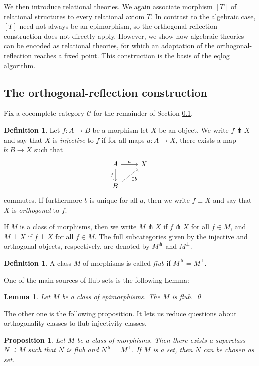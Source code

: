 \documentclass[a4paper]{article}
\newtheorem{lemma}[theorem]{Lemma}
\newtheorem{proposition}[theorem]{Proposition}
\theoremstyle{remark}
\theoremstyle{definition}
\newtheorem{definition}[theorem]{Definition}
\begin{document}
We then introduce relational theories.
We again associate morphism $[T]$ of relational structures to every relational axiom $T$.
In contrast to the algebraic case, $[T]$ need not always be an epimorphism, so the orthogonal-reflection construction does not directly apply.
However, we show how algebraic theories can be encoded as relational theories, for which an adaptation of the orthogonal-reflection reaches a fixed point.
This construction is the basis of the eqlog algorithm.

\subsection{The orthogonal-reflection construction}
\label{subsec:orthogonal-reflection}

Fix a cocomplete category $\mathcal{C}$ for the remainder of Section \ref{subsec:orthogonal-reflection}.

\begin{definition}
  Let $f : A \rightarrow B$ be a morphism let $X$ be an object.
  We write $f \pitchfork X$ and say that $X$ is \emph{injective} to $f$ if for all maps $a : A \rightarrow X$, there exists a map $b : B \rightarrow X$ such that
  \begin{equation}
    \begin{tikzcd}
      A \arrow[r, "a"] \arrow[d, "f"'] & X \\
      B \arrow[ur, dashed, "\exists b"']
    \end{tikzcd}
  \end{equation}
  commutes.
  If furthermore $b$ is unique for all $a$, then we write $f \perp X$ and say that $X$ is \emph{orthogonal} to $f$.

  If $M$ is a class of morphisms, then we write $M \pitchfork X$ if $f \pitchfork X$ for all $f \in M$, and $M \perp X$ if $f \perp X$ for all $f \in M$.
  The full subcategories given by the injective and orthogonal objects, respectively, are denoted by $M^\pitchfork$ and $M^\perp$.
\end{definition}

\begin{definition}
  \label{def:flub}
  A class $M$ of morphisms is called \emph{flub} if $M^\pitchfork = M^\perp$.
\end{definition}

One of the main sources of flub sets is the following Lemma:
\begin{lemma}
  Let $M$ be a class of epimorphisms.
  The $M$ is flub.
  \qed
\end{lemma}

The other one is the following proposition.
It lets us reduce questions about orthogonality classes to flub injectivity classes.
\begin{proposition}
	Let $M$ be a class of morphisms.
	Then there exists a superclass $N \supseteq M$ such that $N$ is flub and $N^\pitchfork = M^\perp$.
  If $M$ is a set, then $N$ can be chosen as set.
\end{proposition}

% 
% 
\end{document}
